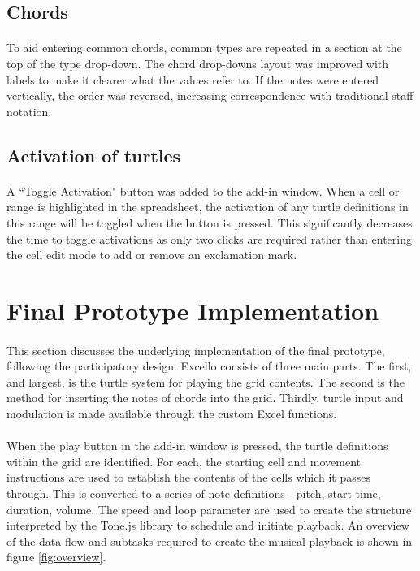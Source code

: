 \subsection{Chords}

\paragraph{} To aid entering common chords, common types are repeated in a section at the top of the type drop-down. The chord drop-downs layout was improved with labels to make it clearer what the values refer to. If the notes were entered vertically, the order was reversed, increasing correspondence with traditional staff notation.

\subsection{Activation of turtles}

\paragraph{} A ``Toggle Activation" button was added to the add-in window. When a cell or range is highlighted in the spreadsheet, the activation of any turtle definitions in this range will be toggled when the button is pressed.  This significantly decreases the time to toggle activations as only two clicks are required rather than entering the cell edit mode to add or remove an exclamation mark.

\section{Final Prototype Implementation}

\paragraph{} This section discusses the underlying implementation of the final prototype, following the participatory design. Excello consists of three main parts. The first, and largest, is the turtle system for playing the grid contents. The second is the method for inserting the notes of chords into the grid. Thirdly, turtle input and modulation is made available through the custom Excel functions.

\paragraph{} When the play button in the add-in window is pressed, the turtle definitions within the grid are identified. For each, the starting cell and movement instructions are used to establish the contents of the cells which it passes through. This is converted to a series of note definitions - pitch, start time, duration, volume. The speed and loop parameter are used to create the structure interpreted by the Tone.js library to schedule and initiate playback. An overview of the data flow and subtasks required to create the musical playback is shown in figure \ref{fig:overview}.

